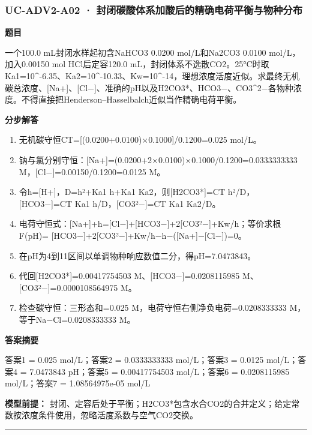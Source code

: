 \documentclass[UTF8,11pt,a4paper]{ctexart}
\begin{document}
\subsubsection*{UC-ADV2-A02 · 封闭碳酸体系加酸后的精确电荷平衡与物种分布}
\noindent\textbf{题目}\par
一个100.0 mL封闭水样起初含NaHCO3 0.0200 mol/L和Na2CO3 0.0100 mol/L，加入0.00150 mol HCl后定容120.0 mL，封闭体系不逸散CO2。25°C时取Ka1=10\textasciicircum{}-6.35、Ka2=10\textasciicircum{}-10.33、Kw=10\textasciicircum{}-14，理想浓度活度近似。求最终无机碳总浓度、[Na+]、[Cl−]、准确的pH以及H2CO3*、HCO3−、CO3\textasciicircum{}2−各物种浓度。不得直接把Henderson–Hasselbalch近似当作精确电荷平衡。\par
\medskip\noindent\textbf{分步解答}
\begin{enumerate}
\item 无机碳守恒CT=[(0.0200+0.0100)×0.1000]/0.1200=0.025 mol/L。
\item 钠与氯分别守恒：[Na+]=(0.0200+2×0.0100)×0.1000/0.1200=0.0333333333 M，[Cl−]=0.00150/0.1200=0.0125 M。
\item 令h=[H+]，D=h²+Ka1 h+Ka1 Ka2，则[H2CO3*]=CT h²/D，[HCO3−]=CT Ka1 h/D，[CO3²−]=CT Ka1 Ka2/D。
\item 电荷守恒式：[Na+]+h=[Cl−]+[HCO3−]+2[CO3²−]+Kw/h；等价求根F(pH)= [HCO3−]+2[CO3²−]+Kw/h−h−([Na+]−[Cl−])=0。
\item 在pH为4到11区间以单调物种响应数值二分，得pH=7.0473843。
\item 代回[H2CO3*]=0.00417754503 M、[HCO3−]=0.0208115985 M、[CO3²−]=0.0000108564975 M。
\item 检查碳守恒：三形态和=0.025 M，电荷守恒右侧净负电荷=0.0208333333 M，等于Na−Cl=0.0208333333 M。
\end{enumerate}
\noindent\textbf{答案摘要}\par
答案1 = 0.025 mol/L；答案2 = 0.0333333333 mol/L；答案3 = 0.0125 mol/L；答案4 = 7.0473843 pH；答案5 = 0.00417754503 mol/L；答案6 = 0.0208115985 mol/L；答案7 = 1.08564975e-05 mol/L\par
\noindent\textbf{模型前提：}
封闭、定容后处于平衡；H2CO3*包含水合CO2的合并定义；给定常数按浓度条件使用，忽略活度系数与空气CO2交换。\par
\medskip\hrule\medskip
{}
\end{document}
